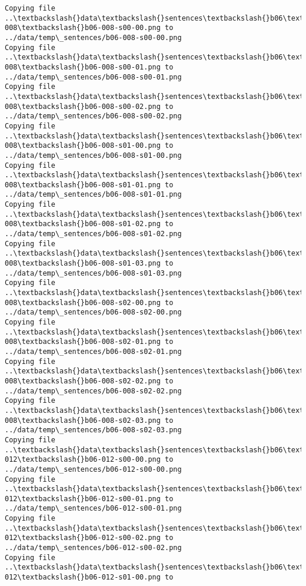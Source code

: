 \documentclass[11pt]{article}
\begin{document}
\begin{Verbatim}[commandchars=\\\{\}]
Copying file ..\textbackslash{}data\textbackslash{}sentences\textbackslash{}b06\textbackslash{}b06-008\textbackslash{}b06-008-s00-00.png to
../data/temp\_sentences/b06-008-s00-00.png
Copying file ..\textbackslash{}data\textbackslash{}sentences\textbackslash{}b06\textbackslash{}b06-008\textbackslash{}b06-008-s00-01.png to
../data/temp\_sentences/b06-008-s00-01.png
Copying file ..\textbackslash{}data\textbackslash{}sentences\textbackslash{}b06\textbackslash{}b06-008\textbackslash{}b06-008-s00-02.png to
../data/temp\_sentences/b06-008-s00-02.png
Copying file ..\textbackslash{}data\textbackslash{}sentences\textbackslash{}b06\textbackslash{}b06-008\textbackslash{}b06-008-s01-00.png to
../data/temp\_sentences/b06-008-s01-00.png
Copying file ..\textbackslash{}data\textbackslash{}sentences\textbackslash{}b06\textbackslash{}b06-008\textbackslash{}b06-008-s01-01.png to
../data/temp\_sentences/b06-008-s01-01.png
Copying file ..\textbackslash{}data\textbackslash{}sentences\textbackslash{}b06\textbackslash{}b06-008\textbackslash{}b06-008-s01-02.png to
../data/temp\_sentences/b06-008-s01-02.png
Copying file ..\textbackslash{}data\textbackslash{}sentences\textbackslash{}b06\textbackslash{}b06-008\textbackslash{}b06-008-s01-03.png to
../data/temp\_sentences/b06-008-s01-03.png
Copying file ..\textbackslash{}data\textbackslash{}sentences\textbackslash{}b06\textbackslash{}b06-008\textbackslash{}b06-008-s02-00.png to
../data/temp\_sentences/b06-008-s02-00.png
Copying file ..\textbackslash{}data\textbackslash{}sentences\textbackslash{}b06\textbackslash{}b06-008\textbackslash{}b06-008-s02-01.png to
../data/temp\_sentences/b06-008-s02-01.png
Copying file ..\textbackslash{}data\textbackslash{}sentences\textbackslash{}b06\textbackslash{}b06-008\textbackslash{}b06-008-s02-02.png to
../data/temp\_sentences/b06-008-s02-02.png
Copying file ..\textbackslash{}data\textbackslash{}sentences\textbackslash{}b06\textbackslash{}b06-008\textbackslash{}b06-008-s02-03.png to
../data/temp\_sentences/b06-008-s02-03.png
Copying file ..\textbackslash{}data\textbackslash{}sentences\textbackslash{}b06\textbackslash{}b06-012\textbackslash{}b06-012-s00-00.png to
../data/temp\_sentences/b06-012-s00-00.png
Copying file ..\textbackslash{}data\textbackslash{}sentences\textbackslash{}b06\textbackslash{}b06-012\textbackslash{}b06-012-s00-01.png to
../data/temp\_sentences/b06-012-s00-01.png
Copying file ..\textbackslash{}data\textbackslash{}sentences\textbackslash{}b06\textbackslash{}b06-012\textbackslash{}b06-012-s00-02.png to
../data/temp\_sentences/b06-012-s00-02.png
Copying file ..\textbackslash{}data\textbackslash{}sentences\textbackslash{}b06\textbackslash{}b06-012\textbackslash{}b06-012-s01-00.png to

\end{Verbatim}
\end{document}
